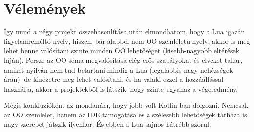 \section{Vélemények}

Így mind a négy projekt összehasonlítása után elmondhatom, hogy a Lua igazán figyelemreméltó nyelv, hiszen, bár alapból nem OO szemléletű nyelv, akkor is meg lehet benne valósítani szinte minden OO lehetőséget (kisebb-nagyobb eltérések híján). Persze az OO séma megvalósítása elég erős szabályokat és elveket takar, amiket nyilván nem tud betartani mindig a Lua (legalábbis nagy nehézségek árán), de kinézetre meg lehet valósítani, és ha valaki ezzel a hozzáállással használja, akkor a projektekből is látszik, hogy szinte ugyanaz a végeredmény.

Mégis konklúzióként az mondanám, hogy jobb volt Kotlin-ban dolgozni. Nemcsak az OO szemlélet, hanem az IDE támogatása és a szélesebb lehetőségek tárháza is nagy szerepet játszik ilyenkor. És ebben a Lua sajnos hátrébb szorul.  







